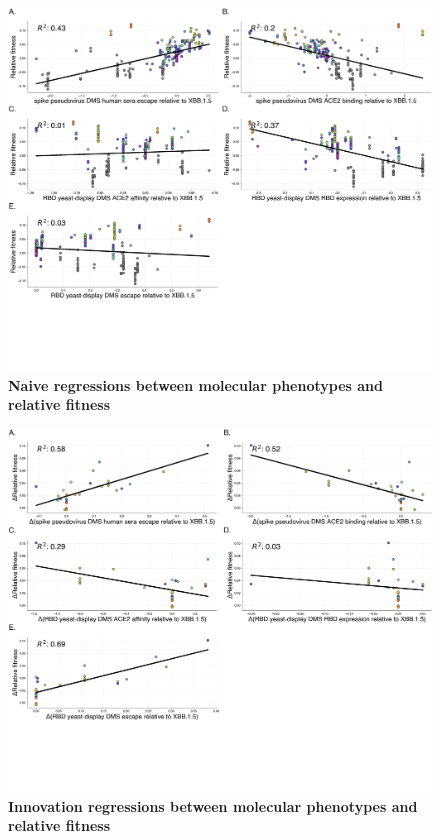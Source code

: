 \begin{figure}[h]
	\centering
	\includegraphics[width=1.0\textwidth]{./supplementary_figures/relative-fitness-single-regressions.png}
	\caption{\textbf{Naive regressions between molecular phenotypes and relative fitness}
	}
	\label{fig:relative-fitness-single-regressions}
\end{figure}


\begin{figure}[h]
	\centering
	\includegraphics[width=1.0\textwidth]{./supplementary_figures/relative-fitness-innovations-single-regressions.png}
	\caption{\textbf{Innovation regressions between molecular phenotypes and relative fitness}
	}
	\label{fig:relative-fitness-innovations-single-regressions}
\end{figure}
